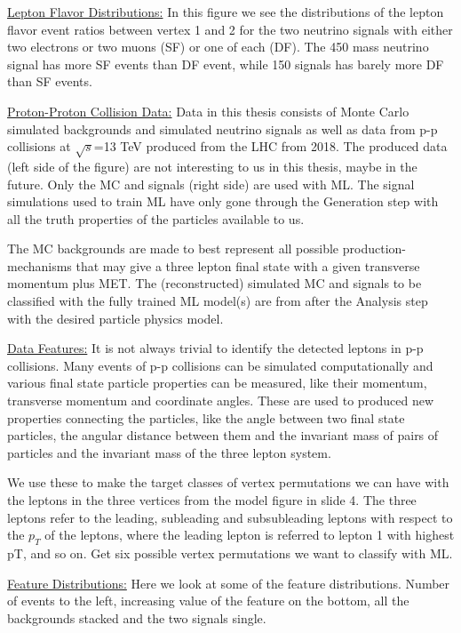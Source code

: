 \documentclass[a4paper, american, 12pt]{report}
\begin{document}
	\underline{Lepton Flavor Distributions:}
	In this figure we see the distributions of the lepton flavor event ratios between vertex 1 and 2 for the two neutrino signals with either two electrons or two muons (SF) or one of each (DF). The 450 mass neutrino signal has more SF events than DF event, while 150 signals has barely more DF than SF events.
	
	
	\underline{Proton-Proton Collision Data:}
	Data in this thesis consists of Monte Carlo simulated backgrounds and simulated neutrino signals as well as data from p-p collisions at $\sqrt{s}$=13 TeV produced from the LHC from 2018. The produced data (left side of the figure) are not interesting to us in this thesis, maybe in the future. Only the MC and signals (right side) are used with ML. The signal simulations used to train ML have only gone through the Generation step with all the truth properties of the particles available to us. 
	
	The MC backgrounds are made to best represent all possible production-mechanisms that may give a three lepton final state with a given transverse momentum plus MET. The (reconstructed) simulated MC and signals to be classified with the fully trained ML model(s) are from after the Analysis step with the desired particle physics model.
	
	
	\underline{Data Features:}
	It is not always trivial to identify the detected leptons in p-p collisions. Many events of p-p collisions can be simulated computationally and various final state particle properties can be measured, like their momentum, transverse momentum and coordinate angles. These are used to produced new properties connecting the particles, like the angle between two final state particles, the angular distance between them and the invariant mass of pairs of particles and the invariant mass of the three lepton system.
	
	We use these to make the target classes of vertex permutations we can have with the leptons in the three vertices from the model figure in slide 4. The three leptons refer to the leading, subleading and subsubleading leptons with respect to the $p_T$ of the leptons, where the leading lepton is referred to lepton 1 with highest pT, and so on. Get six possible vertex permutations we want to classify with ML.
	
	
	\underline{Feature Distributions:}
	Here we look at some of the feature distributions. Number of events to the left, increasing value of the feature on the bottom, all the backgrounds stacked and the two signals single.
	
\end{document}
